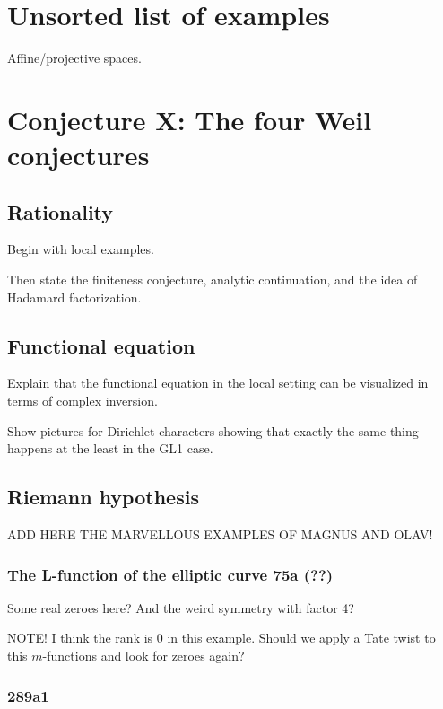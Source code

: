 \documentclass[paper=a4, fontsize=11pt]{scrartcl} %
\numberwithin{equation}{section} %
\numberwithin{figure}{section} %
\numberwithin{table}{section} %
\begin{document}
\section{Unsorted list of examples}

Affine/projective spaces.



\section{Conjecture X: The four Weil conjectures}

\subsection{Rationality}

Begin with local examples.

Then state the finiteness conjecture, analytic continuation, and the idea of Hadamard factorization.

\subsection{Functional equation}

Explain that the functional equation in the local setting can be visualized in terms of complex inversion.

Show pictures for Dirichlet characters showing that exactly the same thing happens at the least in the GL1 case.



\subsection{Riemann hypothesis}

ADD HERE THE MARVELLOUS EXAMPLES OF MAGNUS AND OLAV!

\subsubsection{The L-function of the elliptic curve 75a (??)}

Some real zeroes here? And the weird symmetry with factor 4?

NOTE! I think the rank is 0 in this example. Should we apply a Tate twist to this $m$-functions and look for zeroes again?

\subsubsection{289a1}
\end{document}

